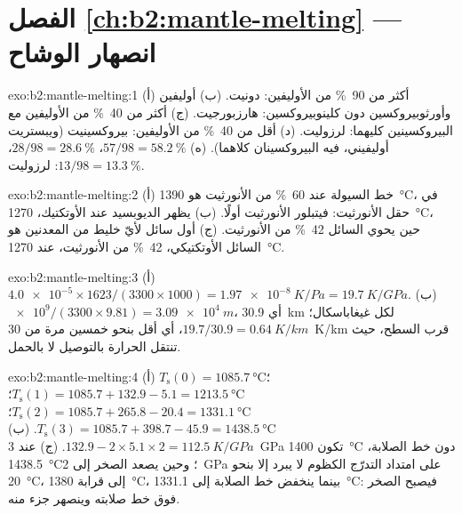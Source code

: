 \section*{الفصل \ref{ch:b2:mantle-melting} --- انصهار الوشاح}

\begin{solution}{exo:b2:mantle-melting:1}
(أ) أكثر من \qty{90}{\percent} من الأوليفين: دونيت. (ب) أوليفين وأورثوبيروكسين
دون كلينوبيروكسين: هارزبورجيت. (ج) أكثر من \qty{40}{\percent} من الأوليفين مع
البيروكسينين كليهما: لرزوليت. (د) أقل من \qty{40}{\percent} من الأوليفين: بيروكسينيت
(ويبستريت أوليفيني، فيه البيروكسينان كلاهما). (ه) $57/98 = \qty{58.2}{\percent}$،
$28/98 = \qty{28.6}{\percent}$، $13/98 = \qty{13.3}{\percent}$: لرزوليت.
\end{solution}

\begin{solution}{exo:b2:mantle-melting:2}
(أ) خط السيولة عند \qty{60}{\percent} من الأنورثيت هو \qty{1390}{\celsius}، في
حقل الأنورثيت: فيتبلور الأنورثيت أولًا. (ب) يظهر الديوبسيد عند
الأوتكتيك، \qty{1270}{\celsius}، حين يحوي السائل \qty{42}{\percent} من الأنورثيت.
(ج) أول سائل لأيّ خليط من المعدنين هو السائل الأوتكتيكي،
\qty{42}{\percent} من الأنورثيت، عند \qty{1270}{\celsius}.
\end{solution}

\begin{solution}{exo:b2:mantle-melting:3}
(أ) $\num{4.0e-5}\times1623/(3300\times1000) = \qty{1.97e-8}{K/Pa} =
\qty{19.7}{K/GPa}$. (ب) $\num{e9}/(3300\times9.81) = \qty{3.09e4}{m}$، أي
\qty{30.9}{km} لكل غيغاباسكال؛ $19.7/30.9 = \qty{0.64}{K/km}$، أي أقل بنحو خمسين
مرة من \qty{30}{K/km} قرب السطح، حيث تنتقل الحرارة بالتوصيل لا
بالحمل.
\end{solution}

\begin{solution}{exo:b2:mantle-melting:4}
(أ) $T_{\mathrm s}(0) = \qty{1085.7}{\celsius}$؛ $T_{\mathrm s}(1) = 1085.7 +
132.9 - 5.1 = \qty{1213.5}{\celsius}$؛ $T_{\mathrm s}(2) = 1085.7 + 265.8 - 20.4 =
\qty{1331.1}{\celsius}$؛ $T_{\mathrm s}(3) = 1085.7 + 398.7 - 45.9 =
\qty{1438.5}{\celsius}$. (ب) $132.9 - 2\times5.1\times2 = \qty{112.5}{K/GPa}$.
(ج) عند \qty{3}{GPa} تكون \qty{1400}{\celsius} دون خط الصلابة،
\qty{1438.5}{\celsius}؛ وحين يصعد الصخر إلى \qty{2}{GPa} على امتداد التدرّج الكظوم لا يبرد إلا
بنحو \qty{20}{\celsius}، إلى قرابة \qty{1380}{\celsius}، بينما ينخفض خط الصلابة إلى
\qty{1331.1}{\celsius}: فيصبح الصخر فوق خط صلابته وينصهر جزء منه.
\end{solution}

